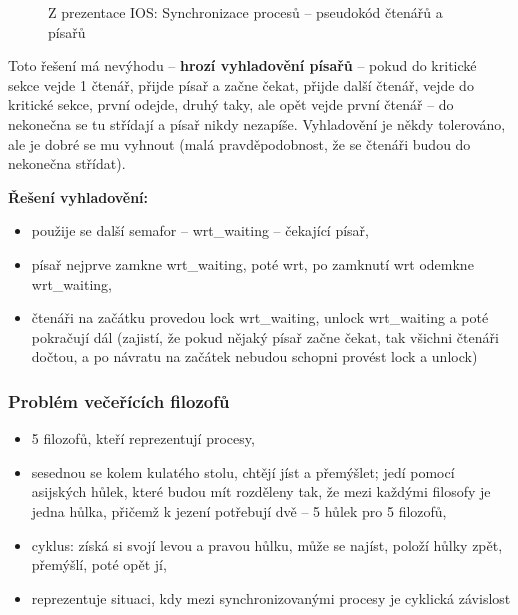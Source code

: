 \documentclass[a4paper, 11pt]{article}
\begin{document}
\begin{figure} [ht]
    \centering
    \caption{Z prezentace IOS: Synchronizace procesů -- pseudokód čtenářů a písařů}
\end{figure}

Toto řešení má nevýhodu -- \textbf{hrozí vyhladovění písařů} -- pokud do kritické sekce vejde 1 čtenář, přijde písař a začne čekat, přijde další čtenář, vejde do kritické sekce, první odejde, druhý taky, ale opět vejde první čtenář -- do nekonečna se tu střídají a písař nikdy nezapíše. Vyhladovění je někdy tolerováno, ale je dobré se mu vyhnout (malá pravděpodobnost, že se čtenáři budou do nekonečna střídat).
 
\textbf{Řešení vyhladovění:}
\begin{itemize}
    \item použije se další semafor -- wrt\_waiting -- čekající písař,
    \item písař nejprve zamkne wrt\_waiting, poté wrt, po zamknutí wrt odemkne wrt\_waiting,
    \item čtenáři na začátku provedou lock wrt\_waiting, unlock wrt\_waiting a poté pokračují dál (zajistí, že pokud nějaký písař začne čekat, tak všichni čtenáři dočtou, a po návratu na začátek nebudou schopni provést lock a unlock) \\
\end{itemize}

\subsubsection{Problém večeřících filozofů}
\begin{itemize}
    \item 5 filozofů, kteří reprezentují procesy,
    \item sesednou se kolem kulatého stolu, chtějí jíst a přemýšlet; jedí pomocí asijských hůlek, které budou mít rozděleny tak, že mezi každými filosofy je jedna hůlka, přičemž k jezení potřebují dvě -- 5 hůlek pro 5 filozofů,
    \item cyklus: získá si svojí levou a pravou hůlku, může se najíst, položí hůlky zpět, přemýšlí, poté opět jí,
    \item reprezentuje situaci, kdy mezi synchronizovanými procesy je cyklická závislost
\end{itemize}
 
\end{document}
